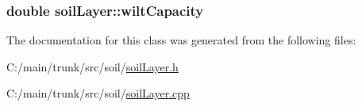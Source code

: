 \label{classsoil_layer_aea0648625d45f262740d107bbdfa4d55}
\hypertarget{classsoil_layer_ae98e1db7a6e369ad8c15667150daaaf0}{
\subsubsection[{wiltCapacity}]{\setlength{\rightskip}{0pt plus 5cm}double {\bf soilLayer::wiltCapacity}}}
\label{classsoil_layer_ae98e1db7a6e369ad8c15667150daaaf0}


The documentation for this class was generated from the following files:\begin{DoxyCompactItemize}
\item 
C:/main/trunk/src/soil/\hyperlink{soil_layer_8h}{soilLayer.h}\item 
C:/main/trunk/src/soil/\hyperlink{soil_layer_8cpp}{soilLayer.cpp}\end{DoxyCompactItemize}
